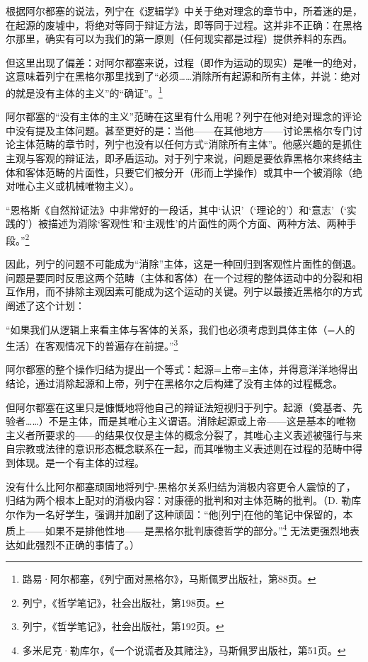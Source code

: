 \documentclass[fontset=fandol, a4paper, 12pt, twoside]{ctexart}
\renewenvironment{quote}
  {\list{}{\rightmargin=0cm \leftmargin=2em}%
   \item\relax\small\kaishu\color{black}}
  {\endlist}
\begin{document}
根据阿尔都塞的说法，列宁在《逻辑学》中关于绝对理念的章节中，所着迷的是，在起源的废墟中，将绝对等同于辩证方法，即等同于过程。这并非不正确：在黑格尔那里，确实有可以为我们的第一原则（任何现实都是过程）提供养料的东西。

但这里出现了偏差：对阿尔都塞来说，过程（即作为运动的现实）是唯一的绝对，这意味着列宁在黑格尔那里找到了“必须……消除所有起源和所有主体，并说：绝对的就是没有主体的主义”的“确证”。\footnote{路易·阿尔都塞，《列宁面对黑格尔》，马斯佩罗出版社，第88页。}

阿尔都塞的“没有主体的主义”范畴在这里有什么用呢？列宁在他对绝对理念的评论中没有提及主体问题。甚至更好的是：当他——在其他地方——讨论黑格尔专门讨论主体范畴的章节时，列宁也没有以任何方式“消除所有主体”。他感兴趣的是抓住主观与客观的辩证法，即矛盾运动。对于列宁来说，问题是要依靠黑格尔来终结主体和客体范畴的片面性，只要它们被分开（形而上学操作）或其中一个被消除（绝对唯心主义或机械唯物主义）。

\begin{quote}
“恩格斯《自然辩证法》中非常好的一段话，其中‘认识’（‘理论的’）和‘意志’（‘实践的’）被描述为消除‘客观性’和‘主观性’的片面性的两个方面、两种方法、两种手段。”\footnote{列宁，《哲学笔记》，社会出版社，第198页。}
\end{quote}

因此，列宁的问题不可能成为“消除”主体，这是一种回归到客观性片面性的倒退。问题是要同时反思这两个范畴（主体和客体）在一个过程的整体运动中的分裂和相互作用，而不排除主观因素可能成为这个运动的关键。列宁以最接近黑格尔的方式阐述了这个计划：

\begin{quote}
“如果我们从逻辑上来看主体与客体的关系，我们也必须考虑到具体主体（=人的生活）在客观情况下的普遍存在前提。”\footnote{列宁，《哲学笔记》，社会出版社，第192页。}
\end{quote}

阿尔都塞的整个操作归结为提出一个等式：起源=上帝=主体，并得意洋洋地得出结论，通过消除起源和上帝，列宁在黑格尔之后构建了没有主体的过程概念。

但阿尔都塞在这里只是慷慨地将他自己的辩证法短视归于列宁。起源（奠基者、先验者……）不是主体，而是其唯心主义谓语。消除起源或上帝——这是基本的唯物主义者所要求的——的结果仅仅是主体的概念分裂了，其唯心主义表述被强行与来自宗教或法律的意识形态概念联系在一起，而其唯物主义表述则在过程的范畴中得到体现。是一个有主体的过程。

没有什么比阿尔都塞顽固地将列宁-黑格尔关系归结为消极内容更令人震惊的了，归结为两个根本上配对的消极内容：对康德的批判和对主体范畴的批判。（D. 勒库尔作为一名好学生，强调并加剧了这种顽固：“他[列宁]在他的笔记中保留的，本质上——如果不是排他性地——是黑格尔批判康德哲学的部分。”\footnote{多米尼克·勒库尔，《一个说谎者及其赌注》，马斯佩罗出版社，第51页。} 无法更强烈地表达如此强烈不正确的事情了。）
\end{document}
